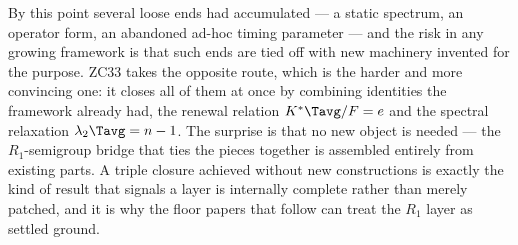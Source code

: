 \documentclass[12pt, a4paper]{article}
\begin{document}
By this point several loose ends had accumulated --- a static spectrum, an
operator form, an abandoned ad-hoc timing parameter --- and the risk in any
growing framework is that such ends are tied off with new machinery invented for
the purpose. ZC33 takes the opposite route, which is the harder and more
convincing one: it closes all of them at once by combining identities the
framework already had, the renewal relation $K^*\Tavg/F=e$ and the spectral
relaxation $\lambda_2\Tavg=n-1$. The surprise is that no new object is needed ---
the $R_1$-semigroup bridge that ties the pieces together is assembled entirely
from existing parts. A triple closure achieved without new constructions is
exactly the kind of result that signals a layer is internally complete rather
than merely patched, and it is why the floor papers that follow can treat the
$R_1$ layer as settled ground.


\end{document}
